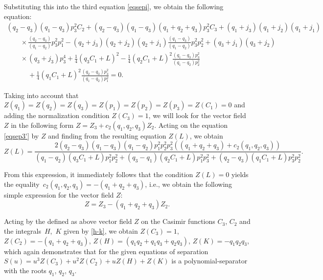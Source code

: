 \documentclass[pdftex]{sigma}
\numberwithin{equation}{section}
\begin{document}
Substituting this into the third equation \eqref{eqsepi}, we obtain the following equation:
\begin{gather}
(q_2-q_3) (q_1-q_3) p_3^2 C_2+(q_2-q_3) (q_1-q_3) (q_1+q_2+q_3) p_3^2 C_3+ (q_1+j_3) (q_1+j_2) (q_1+j_1)\nonumber\\
\qquad\times \frac{ (q_2-q_3)}{(q_1 -q_2)} p_3^2 p_1^2
-(q_2+j_3) (q_2+j_2) (q_2+j_1)\frac{(q_1-q_3) }{(q_1-q_2)} p_3^2 p_2^2+(q_3+j_1) (q_3+j_2)\nonumber\\
\qquad\times (q_3+j_3) p_3^4+ \frac{1}{4} (q_3 C_1+L)^2-\frac{1}{4} (q_2 C_1+L)^2
\frac{(q_1-q_3) p_3^2}{(q_1-q_2) p_2^2}\nonumber\\
\phantom{\qquad\times}{}+ \frac{1}{4}(q_1 C_1+L)^2 \frac{(q_2-q_3) p_3^2}{(q_1-q_2) p_1^2}=0.\label{eqsep3'}
\end{gather}

Taking into account that
$
Z(q_1)=Z(q_2)=Z(q_3)=Z(p_1)=Z(p_2)=Z(p_3)= Z(C_1)=0
$
and adding the normalization condition $Z(C_3)=1$, we will look for the vector field $Z$ in the following form
$
Z=Z_3+c_2(q_1,q_2,q_3) Z_2$.
Acting on the equation \eqref{eqsep3'} by $Z$ and finding from the resulting equation $Z(L)$, we obtain
\begin{equation*}
Z(L)= \frac{2 (q_2-q_3)(q_1-q_3)(q_1-q_2) p_1^2p_2^2p_3^2((q_1+q_2+q_3)+c_2(q_1,q_2,q_3))}{ (q_1-q_2)(q_3C_1+L)p_1^2 p_2^2 +(q_3-q_1)(q_2C_1+L) p_1^2 p_3^2+(q_2-q_3)(q_1C_1+L)p_3^2p_2^2 }.
\end{equation*}

From this expression, it immediately follows that the condition $Z(L)=0$ yields the equality~${c_2(q_1,q_2,q_3)=-(q_1+q_2+q_3)}$, i.e.,
we obtain the following simple expression for the vector field $Z$:
\[
Z=Z_3-(q_1+q_2+q_3) Z_2.
\]


Acting by the defined as above vector field $Z$ on the Casimir functions $C_3$, $C_2$ and the integrals~$H$,~$K$ given by \eqref{h-k}, we obtain
$
Z(C_3)=1$, $ Z(C_2)=-(q_1+q_2+q_3)$, $ Z(H)= (q_1q_2+q_1q_3+q_2q_3)$, $ Z(K)= -q_1q_2q_3$,
which again demonstrates that for the given equations of separation $S(u)=u^3 Z(C_3)+ u^2 Z(C_2)+u Z(H)+ Z(K)$ is a polynomial-separator with the roots $q_1$, $q_2$, $q_3$.
\end{document}
